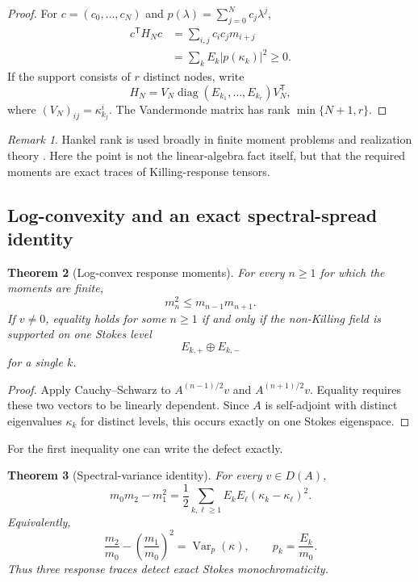 \documentclass[
 aps,
 prd,
 reprint,
 amsmath,
 amssymb,
 nofootinbib,
 superscriptaddress
]{revtex4-2}
\newtheorem{theorem}{Theorem}[section]
\theoremstyle{definition}
\theoremstyle{remark}
\newtheorem{remark}[theorem]{Remark}
\begin{document}
\begin{proof}
For $c=(c_0,\ldots,c_N)$ and
$p(\lambda)=\sum_{j=0}^Nc_j\lambda^j$,
\begin{align*}
 c^\mathsf T H_Nc
 &=
 \sum_{i,j}c_ic_jm_{i+j}\\
 &=
 \sum_kE_k|p(\kappa_k)|^2
 \ge0.
\end{align*}
If the support consists of $r$ distinct nodes, write
\[
 H_N
 =
 V_N
 \operatorname{diag}(E_{k_1},\ldots,E_{k_r})
 V_N^\mathsf T,
\]
where $(V_N)_{ij}=\kappa_{k_j}^i$.
The Vandermonde matrix has rank $\min\{N+1,r\}$.
\end{proof}

\begin{remark}
Hankel rank is used broadly in finite moment problems and realization theory
\cite{Fasino1995}.  Here the point is not the linear-algebra fact itself, but
that the required moments are exact traces of Killing-response tensors.
\end{remark}

\subsection{Log-convexity and an exact spectral-spread identity}

\begin{theorem}[Log-convex response moments]
\label{R:hi:thm:logconvex}
For every $n\ge1$ for which the moments are finite,
\begin{equation}
 \boxed{
 m_n^2
 \le
 m_{n-1}m_{n+1}.
 }
 \label{R:hi:eq:logconvex}
\end{equation}
If $v\ne0$, equality holds for some $n\ge1$ if and only if the non-Killing
field is supported on one Stokes level
\[
       E_{k,+}\oplus E_{k,-}
\]
for a single $k$.
\end{theorem}

\begin{proof}
Apply Cauchy--Schwarz to
$A^{(n-1)/2}v$ and $A^{(n+1)/2}v$.
Equality requires these two vectors to be linearly dependent.  Since $A$ is
self-adjoint with distinct eigenvalues $\kappa_k$ for distinct levels, this
occurs exactly on one Stokes eigenspace.
\end{proof}

For the first inequality one can write the defect exactly.

\begin{theorem}[Spectral-variance identity]
\label{R:hi:thm:variance}
For every $v\in D(A)$,
\begin{equation}
 \boxed{
 m_0m_2-m_1^2
 =
 \frac12
 \sum_{k,\ell\ge1}
 E_kE_\ell
 (\kappa_k-\kappa_\ell)^2.
 }
 \label{R:hi:eq:variance}
\end{equation}
Equivalently,
\begin{equation}
 \frac{m_2}{m_0}
 -
 \left(\frac{m_1}{m_0}\right)^2
 =
 \operatorname{Var}_{p}(\kappa),
 \qquad
 p_k=\frac{E_k}{m_0}.
 \label{R:hi:eq:normalizedvariance}
\end{equation}
Thus three response traces detect exact Stokes monochromaticity.
\end{theorem}
\end{document}
